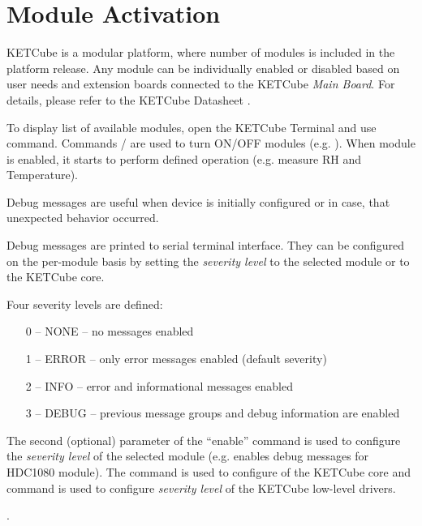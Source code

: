 \section{Module Activation}\label{sec:activation}
KETCube is a modular platform, where number of modules is included in the platform release. Any module can be individually enabled or disabled based on user needs and extension boards connected to the KETCube {\it Main Board}. For details, please refer to the KETCube Datasheet \cite{ZCU:KETCube:05-2018}.

To display list of available modules, open the KETCube Terminal and use  command. Commands / are used to turn ON/OFF modules (e.g. ). When module is enabled, it starts to perform defined operation (e.g. measure RH and Temperature).

Debug messages are useful when device is initially configured or in case, that unexpected behavior occurred.

Debug messages are printed to serial terminal interface. They can be configured on the per-module basis by setting the {\it severity level} to the selected module or to the KETCube core.

Four severity levels are defined:
\begin{itemize}
  \item[0 --] NONE -- no messages enabled
  \item[1 --] ERROR -- only error messages enabled (default severity)
  \item[2 --] INFO -- error and informational messages enabled
  \item[3 --] DEBUG -- previous message groups and debug information are enabled
\end{itemize}

The second (optional) parameter of the “enable” command is used to configure the {\it severity level} of the selected module (e.g.  enables debug messages for HDC1080 module). The command  is used to configure  of the KETCube core and command  is used to configure {\it severity level} of the KETCube low-level drivers.

.

